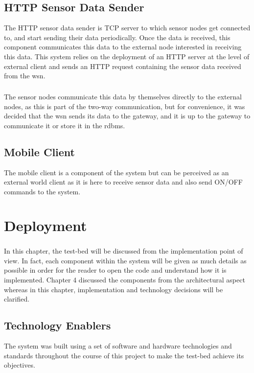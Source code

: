 \documentclass[oneside,12pt,a4paper,final]{book}
\begin{document}
\section{HTTP Sensor Data Sender} 
The HTTP sensor data sender is TCP server to which sensor nodes get connected to, and start sending their data periodically. Once the data is received, this component communicates this data to the external node interested in receiving this data. This system relies on the deployment of an HTTP server at the level of external client and sends an HTTP request containing the sensor data received from the \gls{wsn}. 
\paragraph{}
The sensor nodes communicate this data by themselves directly to the external nodes, as this is part of the two-way communication, but for convenience, it was decided that the \gls{wsn} sends its data to the gateway, and it is up to the gateway to communicate it or store it in the \gls{rdbms}.
\section{Mobile Client}
The mobile client is a component of the system but can be perceived as an external world client as it is here to receive sensor data and also send ON/OFF commands to the system.

\chapter{Deployment}
\paragraph{}
In this chapter, the test-bed will be discussed from the implementation point of view. In fact, each component within the system will be given as much details as possible in order for the reader to open the code and understand how it is implemented. Chapter 4 discussed the components from the architectural aspect whereas in this chapter, implementation and technology decisions will be clarified.
\section{Technology Enablers}
The system was built using a set of software and hardware technologies and standards throughout the course of this project to make the test-bed achieve its objectives.
\end{document}
